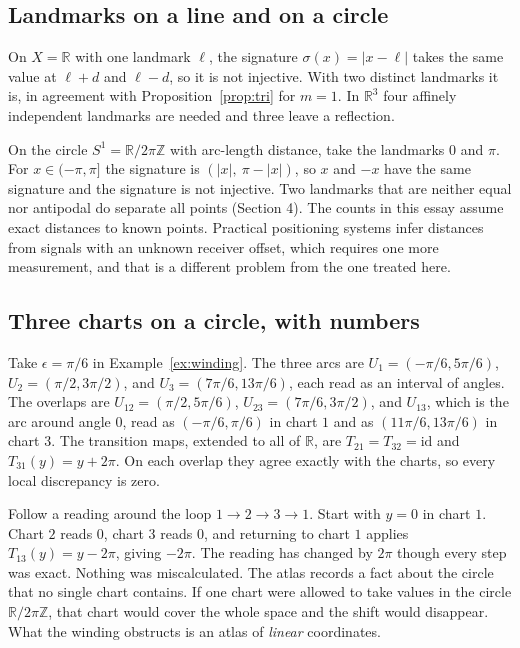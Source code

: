 \documentclass[11pt]{article}
\theoremstyle{remark}
\newcommand{\R}{\mathbb{R}}
\begin{document}
\subsection{Landmarks on a line and on a circle}

On $X=\R$ with one landmark $\ell$, the signature $\sigma(x)=|x-\ell|$ takes the same value at $\ell+d$ and $\ell-d$, so it is not injective. With two distinct landmarks it is, in agreement with Proposition~\ref{prop:tri} for $m=1$. In $\R^3$ four affinely independent landmarks are needed and three leave a reflection.

On the circle $S^1=\R/2\pi\mathbb Z$ with arc-length distance, take the landmarks $0$ and $\pi$. For $x\in(-\pi,\pi]$ the signature is $(|x|,\ \pi-|x|)$, so $x$ and $-x$ have the same signature and the signature is not injective. Two landmarks that are neither equal nor antipodal do separate all points (Section 4). The counts in this essay assume exact distances to known points. Practical positioning systems infer distances from signals with an unknown receiver offset, which requires one more measurement, and that is a different problem from the one treated here.

\subsection{Three charts on a circle, with numbers}

Take $\epsilon=\pi/6$ in Example~\ref{ex:winding}. The three arcs are $U_1=(-\pi/6,5\pi/6)$, $U_2=(\pi/2,3\pi/2)$, and $U_3=(7\pi/6,13\pi/6)$, each read as an interval of angles. The overlaps are $U_{12}=(\pi/2,5\pi/6)$, $U_{23}=(7\pi/6,3\pi/2)$, and $U_{13}$, which is the arc around angle $0$, read as $(-\pi/6,\pi/6)$ in chart $1$ and as $(11\pi/6,13\pi/6)$ in chart $3$. The transition maps, extended to all of $\R$, are $T_{21}=T_{32}=\mathrm{id}$ and $T_{31}(y)=y+2\pi$. On each overlap they agree exactly with the charts, so every local discrepancy is zero.

Follow a reading around the loop $1\to2\to3\to1$. Start with $y=0$ in chart $1$. Chart $2$ reads $0$, chart $3$ reads $0$, and returning to chart $1$ applies $T_{13}(y)=y-2\pi$, giving $-2\pi$. The reading has changed by $2\pi$ though every step was exact. Nothing was miscalculated. The atlas records a fact about the circle that no single chart contains. If one chart were allowed to take values in the circle $\R/2\pi\mathbb Z$, that chart would cover the whole space and the shift would disappear. What the winding obstructs is an atlas of \emph{linear} coordinates.
\end{document}
